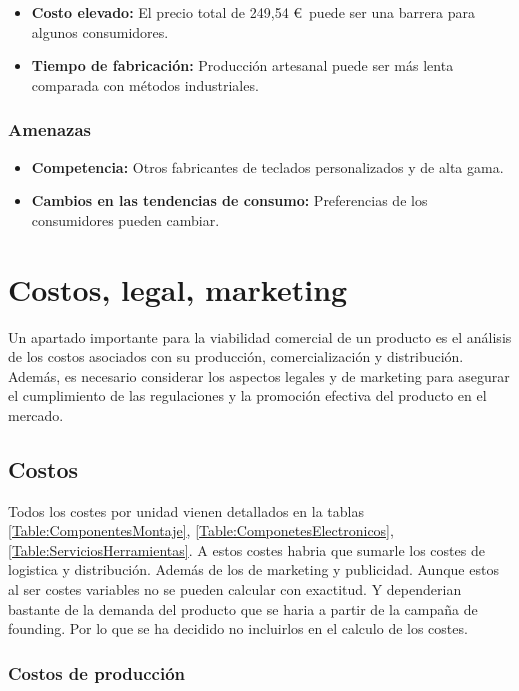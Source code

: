\begin{itemize}
    \item \textbf{Costo elevado:} El precio total de 249,54 \euro~puede ser una barrera para algunos consumidores.
    \item \textbf{Tiempo de fabricación:} Producción artesanal puede ser más lenta comparada con métodos industriales.
\end{itemize}

\subsubsection{Amenazas}

\begin{itemize}
    \item \textbf{Competencia:} Otros fabricantes de teclados personalizados y de alta gama.
    \item \textbf{Cambios en las tendencias de consumo:} Preferencias de los consumidores pueden cambiar.
\end{itemize}

\section{Costos, legal, marketing}

Un apartado importante para la viabilidad comercial de un producto es el análisis de los costos asociados con su producción, comercialización y distribución. Además, es necesario considerar los aspectos legales y de marketing para asegurar el cumplimiento de las regulaciones y la promoción efectiva del producto en el mercado.

\subsection{Costos}

Todos los costes por unidad vienen detallados en la tablas \ref{Table:ComponentesMontaje}, \ref{Table:ComponetesElectronicos}, \ref{Table:ServiciosHerramientas}. A estos costes habria que sumarle los costes de logistica y distribución. Además de los de marketing y publicidad. Aunque estos al ser costes variables no se pueden calcular con exactitud. Y dependerian bastante de la demanda del producto que se haria a partir de la campaña de founding. Por lo que se ha decidido no incluirlos en el calculo de los costes.

\subsubsection{Costos de producción} \label{SeccionCostosProduccion}

